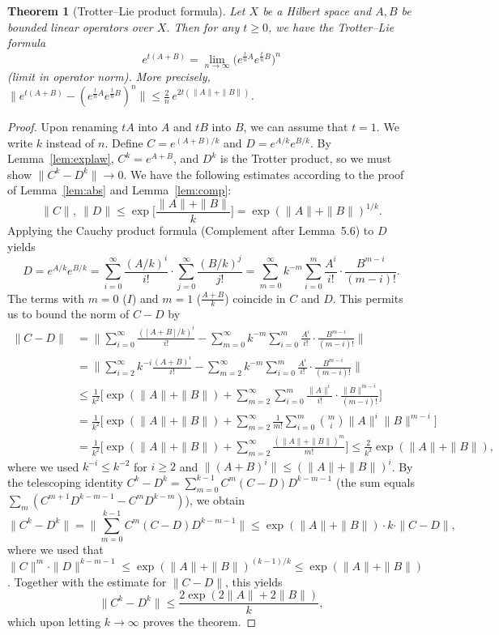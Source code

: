 \documentclass[11pt,a4paper]{article}
\numberwithin{equation}{section}
\theoremstyle{plain}
\newtheorem{theorem}{Theorem}[section]
\theoremstyle{definition}
\theoremstyle{plain}
\theoremstyle{definition}
\begin{document}
\begin{theorem}[Trotter--Lie product formula]\label{thm:trotter}
Let $X$ be a Hilbert space and $A,B$ be bounded linear operators over $X$. Then for any
$t\geqslant0$, we have the Trotter--Lie formula
\[
e^{t(A+B)}=\lim_{n\to\infty}\big(e^{\frac tnA}e^{\frac tnB}\big)^n
\]
(limit in operator norm). More precisely,
$\big\|e^{t(A+B)}-(e^{\frac tnA}e^{\frac tnB})^n\big\|\le\frac2n\,e^{2t(\|A\|+\|B\|)}$.
\end{theorem}
\begin{proof}
Upon renaming $tA$ into $A$ and $tB$ into $B$, we can assume that $t=1$. We write $k$
instead of $n$. Define $C=e^{(A+B)/k}$ and $D=e^{A/k}e^{B/k}$. By Lemma~\ref{lem:explaw},
$C^k=e^{A+B}$, and $D^k$ is the Trotter product, so we must show $\|C^k-D^k\|\to0$.
We have the following estimates according to the proof of Lemma~\ref{lem:abs} and
Lemma~\ref{lem:comp}:
\[
\|C\|,\ \|D\|\le\exp\Big[\frac{\|A\|+\|B\|}k\Big]=\exp(\|A\|+\|B\|)^{1/k}.
\]
Applying the Cauchy product formula (Complement after Lemma~5.6) to $D$ yields
\[
D=e^{A/k}e^{B/k}=\sum_{i=0}^\infty\frac{(A/k)^i}{i!}\cdot\sum_{j=0}^\infty\frac{(B/k)^j}{j!}
=\sum_{m=0}^\infty k^{-m}\sum_{i=0}^m\frac{A^i}{i!}\cdot\frac{B^{m-i}}{(m-i)!}.
\]
The terms with $m=0$ ($I$) and $m=1$ ($\frac{A+B}k$) coincide in $C$ and $D$. This permits
us to bound the norm of $C-D$ by
\begin{align*}
\|C-D\|&=\Big\|\sum_{i=0}^\infty\frac{([A+B]/k)^i}{i!}-\sum_{m=0}^\infty k^{-m}\sum_{i=0}^m\frac{A^i}{i!}\cdot\frac{B^{m-i}}{(m-i)!}\Big\|\\
&=\Big\|\sum_{i=2}^\infty k^{-i}\frac{(A+B)^i}{i!}-\sum_{m=2}^\infty k^{-m}\sum_{i=0}^m\frac{A^i}{i!}\cdot\frac{B^{m-i}}{(m-i)!}\Big\|\\
&\le\frac1{k^2}\Big[\exp(\|A\|+\|B\|)+\sum_{m=2}^\infty\sum_{i=0}^m\frac{\|A\|^i}{i!}\cdot\frac{\|B\|^{m-i}}{(m-i)!}\Big]\\
&=\frac1{k^2}\Big[\exp(\|A\|+\|B\|)+\sum_{m=2}^\infty\frac1{m!}\sum_{i=0}^m\binom mi\|A\|^i\|B\|^{m-i}\Big]\\
&=\frac1{k^2}\Big[\exp(\|A\|+\|B\|)+\sum_{m=2}^\infty\frac{(\|A\|+\|B\|)^m}{m!}\Big]
\le\frac2{k^2}\exp(\|A\|+\|B\|),
\end{align*}
where we used $k^{-i}\le k^{-2}$ for $i\ge2$ and $\|(A+B)^i\|\le(\|A\|+\|B\|)^i$.
By the telescoping identity
$C^k-D^k=\sum_{m=0}^{k-1}C^m(C-D)D^{k-m-1}$
(the sum equals $\sum_m(C^{m+1}D^{k-m-1}-C^mD^{k-m})$), we obtain
\[
\|C^k-D^k\|=\Big\|\sum_{m=0}^{k-1}C^m(C-D)D^{k-m-1}\Big\|\le\exp(\|A\|+\|B\|)\cdot k\cdot\|C-D\|,
\]
where we used that
$\|C\|^m\cdot\|D\|^{k-m-1}\le\exp(\|A\|+\|B\|)^{(k-1)/k}\le\exp(\|A\|+\|B\|)$. Together
with the estimate for $\|C-D\|$, this yields
\[
\|C^k-D^k\|\le\frac{2\exp(2\|A\|+2\|B\|)}k,
\]
which upon letting $k\to\infty$ proves the theorem.
\end{proof}
\end{document}
